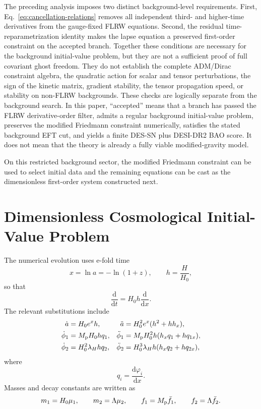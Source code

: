 \documentclass[aps,prd,twocolumn,superscriptaddress,nofootinbib,longbibliography]{revtex4-2}
\newcommand{\dd}{\mathrm{d}}
\newcommand{\Mp}{M_{\rm p}}
\newcommand{\Lam}{\Lambda}
\begin{document}
The preceding analysis imposes two distinct background-level requirements.  First, Eq.~\eqref{eq:cancellation-relations} removes all independent third- and higher-time derivatives from the gauge-fixed FLRW equations.  Second, the residual time-reparametrization identity makes the lapse equation a preserved first-order constraint on the accepted branch.  Together these conditions are necessary for the background initial-value problem, but they are not a sufficient proof of full covariant ghost freedom.  They do not establish the complete ADM/Dirac constraint algebra, the quadratic action for scalar and tensor perturbations, the sign of the kinetic matrix, gradient stability, the tensor propagation speed, or stability on non-FLRW backgrounds.  These checks are logically separate from the background search.  In this paper, ``accepted'' means that a branch has passed the FLRW derivative-order filter, admits a regular background initial-value problem, preserves the modified Friedmann constraint numerically, satisfies the stated background EFT cut, and yields a finite DES-SN plus DESI-DR2 BAO score.  It does not mean that the theory is already a fully viable modified-gravity model.

On this restricted background sector, the modified Friedmann constraint can be used to select initial data and the remaining equations can be cast as the dimensionless first-order system constructed next.

\section{Dimensionless Cosmological Initial-Value Problem}
\label{sec:ivp}

The numerical evolution uses e-fold time
\begin{equation}
x=\ln a=-\ln(1+z),
\qquad
h=\frac{H}{H_0},
\label{eq:xh}
\end{equation}
so that
\begin{equation}
\frac{\dd}{\dd t}=H_0h\frac{\dd}{\dd x}.
\label{eq:chain-rule}
\end{equation}
The relevant substitutions include
\begin{align}
\dot a&=H_0e^xh,
&
\ddot a&=H_0^2e^x(h^2+hh_x),\\
\dot\phi_1&=\Mp H_0h q_1,
&
\ddot\phi_1&=\Mp H_0^2h(h_xq_1+hq_{1x}),\\
\dot\phi_2&=H_0^2\lambda_H h q_2,
&
\ddot\phi_2&=H_0^3\lambda_H h(h_xq_2+hq_{2x}),
\label{eq:rescalings}
\end{align}
where
\begin{equation}
q_i=\frac{\dd\varphi_i}{\dd x}.
\end{equation}
Masses and decay constants are written as
\begin{equation}
m_1=H_0\mu_1,\qquad
m_2=\Lam\mu_2,\qquad
f_1=\Mp \bar f_1,\qquad
f_2=\Lam \bar f_2 .
\end{equation}
\end{document}
